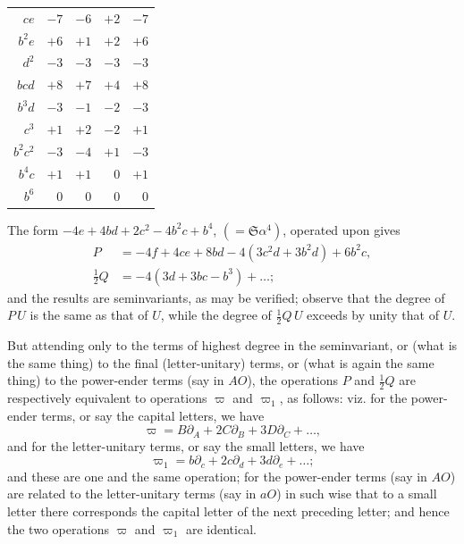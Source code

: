 \documentclass[11pt,a4paper]{book}
\begin{document}
\begin{art}
\begin{center}
\begin{tabular}{r|rrr|r}
$ce$ & $-7$ & $-6$ & $+2$ & $-7$ \\
$b^{2}e$ & $+6$ & $+1$ & $+2$ & $+6$ \\
$d^{2}$ & $-3$ & $-3$ & $-3$ & $-3$ \\
$bcd$ & $+8$ & $+7$ & $+4$ & $+8$ \\
$b^{3}d$ & $-3$ & $-1$ & $-2$ & $-3$ \\
$c^{3}$ & $+1$ & $+2$ & $-2$ & $+1$ \\
$b^{2}c^{2}$ & $-3$ & $-4$ & $+1$ & $-3$ \\
$b^{4}c$ & $+1$ & $+1$ & $0$ & $+1$ \\
$b^{6}$ & $0$ & $0$ & $0$ & $0$ \\
\end{tabular}
\end{center}
\end{art}

\setcounter{art}{31}
\begin{art}
The form $-4e + 4bd + 2c^{2} - 4b^{2}c + b^{4}$, $(= \mathfrak{S}\alpha^{4})$, operated upon gives
\begin{align*}
P &= -4f + 4ce + 8bd - 4(3c^{2}d + 3b^{2}d) + 6b^{2}c,\\
\tfrac{1}{2}Q &= -4(3d + 3bc - b^{3}) + \ldots;
\end{align*}
and the results are seminvariants, as may be verified; observe that the degree of $P\,U$ is the same as that of $U$, while the degree of $\frac{1}{2}Q\,U$ exceeds by unity that of $U$.
\end{art}

\setcounter{art}{32}
\begin{art}
But attending only to the terms of highest degree in the seminvariant, or (what is the same thing) to the final (letter-unitary) terms, or (what is again the same thing) to the power-ender terms (say in $AO$), the operations $P$ and $\frac{1}{2}Q$ are respectively equivalent to operations $\varpi$ and $\varpi_{1}$, as follows: viz. for the power-ender terms, or say the capital letters, we have
\[
\varpi = B\partial_{A} + 2C\partial_{B} + 3D\partial_{C} + \ldots,
\]
and for the letter-unitary terms, or say the small letters, we have
\[
\varpi_{1} = b\partial_{c} + 2c\partial_{d} + 3d\partial_{e} + \ldots;
\]
and these are one and the same operation; for the power-ender terms (say in $AO$) are related to the letter-unitary terms (say in $aO$) in such wise that to a small letter there corresponds the capital letter of the next preceding letter; and hence the two operations $\varpi$ and $\varpi_{1}$ are identical.
\end{art}
\end{document}
